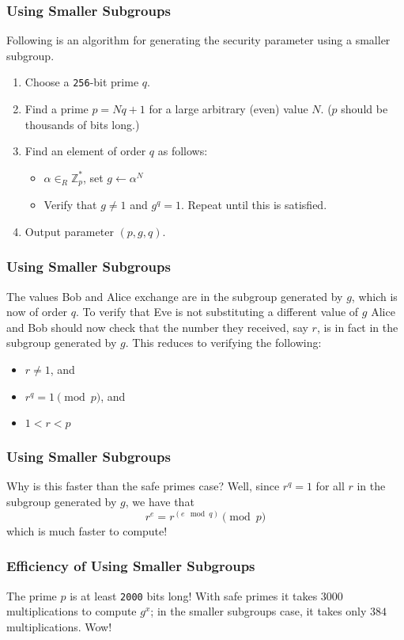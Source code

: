 \documentclass{beamer}
\newcommand{\<}{\langle}
\renewcommand{\>}{\rangle}
\newcommand{\Z}{\mathbb{Z}}
\begin{document}
\begin{frame}[fragile]
\frametitle{Using Smaller Subgroups}

Following is an algorithm for generating the security parameter using a smaller subgroup. 

\begin{enumerate}[(1)]
\item Choose a \verb|256|-bit prime $q$.
\item Find a prime $p = Nq+1$ for a large arbitrary (even) value $N$. ($p$ should be thousands of bits long.)
\item Find an element of order $q$ as follows:
	\begin{itemize}
	\item $\alpha\in_R\Z_p^*$, set $g\leftarrow \alpha^N$
	\item Verify that $g\ne 1$ and $g^q = 1$. Repeat until this is satisfied. 
	\end{itemize}
\item Output parameter $(p, g, q)$.
\end{enumerate}
\end{frame}


\begin{frame}
\frametitle{Using Smaller Subgroups}

The values Bob and Alice exchange are in the subgroup generated by $g$, which is now of order $q$. To verify that Eve is not substituting a different value of $g$ Alice and Bob should now check that the number they received, say $r$, is in fact in the subgroup generated by $g$. This reduces to verifying the following:
\begin{itemize}
\item $r\ne 1$, and
\item $r^q = 1 \pmod p$, and
\item $1 < r < p$
\end{itemize}
\end{frame}

\begin{frame}
\frametitle{Using Smaller Subgroups}

Why is this faster than the safe primes case? Well, since $r^q=1$ for all $r$ in the subgroup generated by $g$, we have that
\[
r^e = r^{(e\mod {q})} \pmod p
\]
which is much faster to compute!
\end{frame}

\begin{frame}[fragile]
\frametitle{Efficiency of Using Smaller Subgroups}

The prime $p$ is at least \verb|2000| bits long! With safe primes it takes $3000$ multiplications to compute $g^x$; in the smaller subgroups case, it takes only $384$ multiplications. Wow!
\end{frame}
\end{document}
